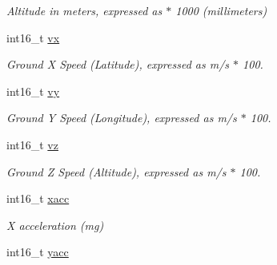 \begin{DoxyCompactItemize}
\begin{DoxyCompactList}\small\item\em Altitude in meters, expressed as $\ast$ 1000 (millimeters) \end{DoxyCompactList}\item 
\hypertarget{struct____mavlink__hil__state__t_a8ea365258210e69427e6c02f82aa710c}{int16\+\_\+t \hyperlink{struct____mavlink__hil__state__t_a8ea365258210e69427e6c02f82aa710c}{vx}}\label{struct____mavlink__hil__state__t_a8ea365258210e69427e6c02f82aa710c}

\begin{DoxyCompactList}\small\item\em Ground X Speed (Latitude), expressed as m/s $\ast$ 100. \end{DoxyCompactList}\item 
\hypertarget{struct____mavlink__hil__state__t_a8d3234cf343035ab3f240f23fac95072}{int16\+\_\+t \hyperlink{struct____mavlink__hil__state__t_a8d3234cf343035ab3f240f23fac95072}{vy}}\label{struct____mavlink__hil__state__t_a8d3234cf343035ab3f240f23fac95072}

\begin{DoxyCompactList}\small\item\em Ground Y Speed (Longitude), expressed as m/s $\ast$ 100. \end{DoxyCompactList}\item 
\hypertarget{struct____mavlink__hil__state__t_add6c834de56047ff2316d059b741cce0}{int16\+\_\+t \hyperlink{struct____mavlink__hil__state__t_add6c834de56047ff2316d059b741cce0}{vz}}\label{struct____mavlink__hil__state__t_add6c834de56047ff2316d059b741cce0}

\begin{DoxyCompactList}\small\item\em Ground Z Speed (Altitude), expressed as m/s $\ast$ 100. \end{DoxyCompactList}\item 
\hypertarget{struct____mavlink__hil__state__t_a8497c1e566b9acb1d4298090c480a212}{int16\+\_\+t \hyperlink{struct____mavlink__hil__state__t_a8497c1e566b9acb1d4298090c480a212}{xacc}}\label{struct____mavlink__hil__state__t_a8497c1e566b9acb1d4298090c480a212}

\begin{DoxyCompactList}\small\item\em X acceleration (mg) \end{DoxyCompactList}\item 
\hypertarget{struct____mavlink__hil__state__t_a670623660d6d3d15121b2698082e8f55}{int16\+\_\+t \hyperlink{struct____mavlink__hil__state__t_a670623660d6d3d15121b2698082e8f55}{yacc}}\label{struct____mavlink__hil__state__t_a670623660d6d3d15121b2698082e8f55}


\end{DoxyCompactItemize}
